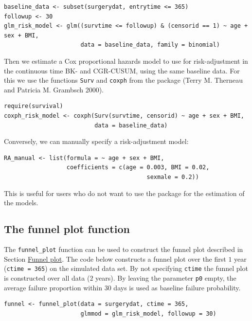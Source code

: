 \begin{verbatim}
baseline_data <- subset(surgerydat, entrytime <= 365)
followup <- 30
glm_risk_model <- glm((survtime <= followup) & (censorid == 1) ~ age + sex + BMI,
                      data = baseline_data, family = binomial)
\end{verbatim}

Then we estimate a Cox proportional hazards model to use for risk-adjustment in the continuous time BK- and CGR-CUSUM, using the same baseline data. For this we use the functions \texttt{Surv} and \texttt{coxph} from the package  (Terry M. Therneau and Patricia M. Grambsch 2000).

\begin{verbatim}
require(survival)
coxph_risk_model <- coxph(Surv(survtime, censorid) ~ age + sex + BMI,
                          data = baseline_data)
\end{verbatim}

Conversely, we can manually specify a risk-adjustment model:

\begin{verbatim}
RA_manual <- list(formula = ~ age + sex + BMI, 
                  coefficients = c(age = 0.003, BMI = 0.02,  
                                         sexmale = 0.2)) 
\end{verbatim}

This is useful for users who do not want to use the package  for the estimation of the models.

\hypertarget{sec:funnelplotfunction}{%
\subsection{The funnel plot function}\label{sec:funnelplotfunction}}

The \texttt{funnel\_plot} function can be used to construct the funnel plot described in Section \protect\hyperlink{sec:FunnelPlot}{Funnel plot}. The code below constructs a funnel plot over the first \(1\) year (\texttt{ctime\ =\ 365}) on the simulated data set. By not specifying \texttt{ctime} the funnel plot is constructed over all data (\(2\) years). By leaving the parameter \texttt{p0} empty, the average failure proportion within \(30\) days is used as baseline failure probability.

\begin{verbatim}
funnel <- funnel_plot(data = surgerydat, ctime = 365, 
                      glmmod = glm_risk_model, followup = 30)
\end{verbatim}

